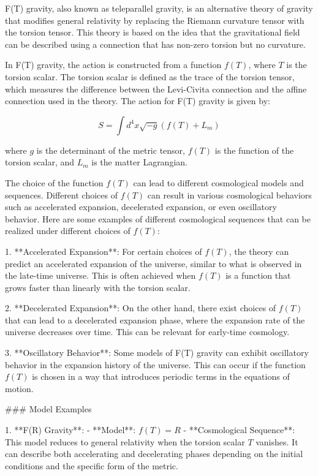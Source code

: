 F(T) gravity, also known as teleparallel gravity, is an alternative theory of gravity that modifies general relativity by replacing the Riemann curvature tensor with the torsion tensor. This theory is based on the idea that the gravitational field can be described using a connection that has non-zero torsion but no curvature.

In F(T) gravity, the action is constructed from a function \( f(T) \), where \( T \) is the torsion scalar. The torsion scalar is defined as the trace of the torsion tensor, which measures the difference between the Levi-Civita connection and the affine connection used in the theory. The action for F(T) gravity is given by:

\[
S = \int d^4x \sqrt{-g} \left( f(T) + L_m \right)
\]

where \( g \) is the determinant of the metric tensor, \( f(T) \) is the function of the torsion scalar, and \( L_m \) is the matter Lagrangian.

The choice of the function \( f(T) \) can lead to different cosmological models and sequences. Different choices of \( f(T) \) can result in various cosmological behaviors such as accelerated expansion, decelerated expansion, or even oscillatory behavior. Here are some examples of different cosmological sequences that can be realized under different choices of \( f(T) \):

1. **Accelerated Expansion**: For certain choices of \( f(T) \), the theory can predict an accelerated expansion of the universe, similar to what is observed in the late-time universe. This is often achieved when \( f(T) \) is a function that grows faster than linearly with the torsion scalar.

2. **Decelerated Expansion**: On the other hand, there exist choices of \( f(T) \) that can lead to a decelerated expansion phase, where the expansion rate of the universe decreases over time. This can be relevant for early-time cosmology.

3. **Oscillatory Behavior**: Some models of F(T) gravity can exhibit oscillatory behavior in the expansion history of the universe. This can occur if the function \( f(T) \) is chosen in a way that introduces periodic terms in the equations of motion.

### Model Examples

1. **F(R) Gravity**:
   - **Model**: \( f(T) = R \)
   - **Cosmological Sequence**: This model reduces to general relativity when the torsion scalar \( T \) vanishes. It can describe both accelerating and decelerating phases depending on the initial conditions and the specific form of the metric.

